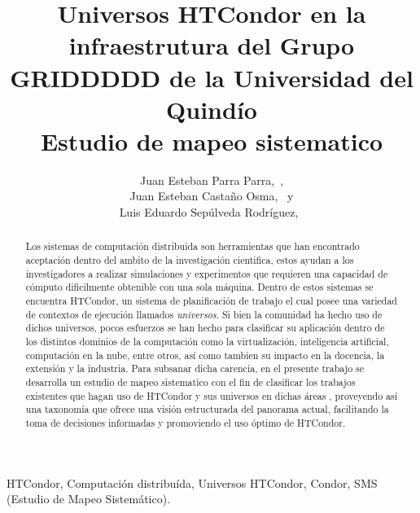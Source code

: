 \documentclass[journal]{IEEEtran}
\begin{document}
\title{
	Universos HTCondor en la infraestrutura del Grupo GRIDDDDD de la
	Universidad del Quindío \\
	Estudio de mapeo sistematico
}

\author{
	Juan Esteban Parra Parra,~, \\
	Juan Esteban Castaño Osma,~ y \\
	Luis Eduardo Sepúlveda Rodríguez,~
}



\maketitle

\begin{abstract}
	Los sistemas de computación distribuida son herramientas que han encontrado aceptación dentro del ambito de la investigación cientifica,
	estos ayudan a los investigadores a realizar simulaciones y experimentos que requieren una capacidad de cómputo
	dificilmente obtenible con una sola máquina. Dentro de estos sistemas se encuentra HTCondor, un sistema de planificación de trabajo el cual posee una
	variedad de contextos de ejecución llamados  \textit{universos}. Si bien la comunidad ha hecho uso de dichos universos,
	pocos esfuerzos se han hecho para clasificar su aplicación dentro de los distintos dominios de la computación como
	la virtualización, inteligencia artificial, computación en la nube, entre otros,
	así como tambien su impacto en la docencia, la extensión y la industria. Para subsanar dicha carencia, en el presente
	trabajo se desarrolla un estudio de mapeo sistematico con el fin de clasificar los trabajos existentes que hagan uso de HTCondor y sus universos
	en dichas áreas , proveyendo así una taxonomía que ofrece una visión estructurada del panorama actual,
	facilitando la toma de decisiones informadas y promoviendo el uso óptimo de HTCondor.

\end{abstract}


\begin{IEEEkeywords}
	HTCondor, Computación distribuída, Universos HTCondor, Condor, SMS (Estudio de Mapeo Sistemático).
\end{IEEEkeywords}
\end{document}
